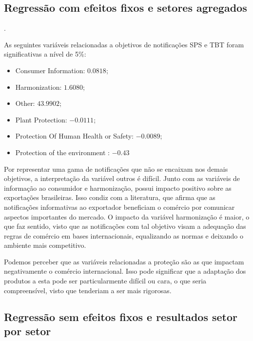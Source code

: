 \documentclass[12pt, a4paper]{article}
\begin{document}
\subsection{Regressão com efeitos fixos e setores agregados}.



As seguintes variáveis relacionadas a objetivos de notificações SPS e TBT foram significativas a nível de 5\%:
\begin{itemize}
    \item Consumer Information: $0.0818$;
    \item Harmonization: $1.6080$;
    \item Other: $43.9902$;
    \item Plant Protection: $-0.0111$;
    \item Protection Of Human Health or Safety: $-0.0089$;
    \item Protection of the environment : $-0.43$
\end{itemize}

Por representar uma gama de notificações que não se encaixam nos demais objetivos, a interpretação da variável outros é difícil. Junto com as variáveis de informação ao consumidor e harmonização, possui impacto positivo sobre as exportações brasileiras. Isso condiz com a literatura, que afirma que as notificações informativas ao exportador beneficiam o comércio por comunicar aspectos importantes do mercado. O impacto da variável harmonização é maior, o que faz sentido, visto que as notificações com tal objetivo visam a adequação das regras de comércio em bases internacionais, equalizando as normas e deixando o ambiente mais competitivo. 

Podemos perceber que as variáveis relacionadas a proteção são as que impactam negativamente o comércio internacional. Isso pode significar que a adaptação dos produtos a esta pode ser particularmente difícil ou cara, o que seria compreensível, visto que tenderiam a ser mais rigorosas.


\subsection{Regressão sem efeitos fixos e resultados setor por setor}





\printbibliography
\end{document}

